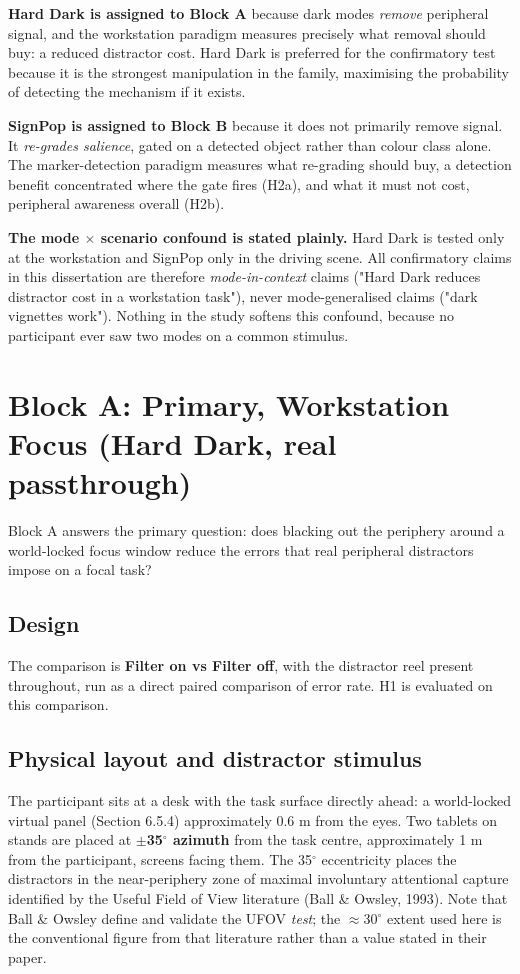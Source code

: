 \textbf{Hard Dark is assigned to Block A} because dark modes \textit{remove} peripheral signal, and the
workstation paradigm measures precisely what removal should buy: a reduced distractor cost. Hard Dark
is preferred for the confirmatory test because it is the strongest manipulation in the family,
maximising the probability of detecting the mechanism if it exists.

\textbf{SignPop is assigned to Block B} because it does not primarily remove signal. It \textit{re-grades
salience}, gated on a detected object rather than colour class alone. The marker-detection paradigm
measures what re-grading should buy, a detection benefit concentrated where the gate fires (H2a), and
what it must not cost, peripheral awareness overall (H2b).

\textbf{The mode $\times$ scenario confound is stated plainly.} Hard Dark is tested only at the workstation and
SignPop only in the driving scene. All confirmatory claims in this dissertation are therefore
\textit{mode-in-context} claims ("Hard Dark reduces distractor cost in a workstation task"), never
mode-generalised claims ("dark vignettes work"). Nothing in the study softens this confound, because
no participant ever saw two modes on a common stimulus.

\section{Block A: Primary, Workstation Focus (Hard Dark, real passthrough)}

Block A answers the primary question: does blacking out the periphery around a world-locked focus
window reduce the errors that real peripheral distractors impose on a focal task?

\subsection{Design}

The comparison is \textbf{Filter on vs Filter off}, with the distractor reel present throughout, run as a
direct paired comparison of error rate. H1 is evaluated on this comparison.

\subsection{Physical layout and distractor stimulus}

The participant sits at a desk with the task surface directly ahead: a world-locked virtual panel
(Section 6.5.4) approximately 0.6 m from the eyes. Two tablets on stands are placed at \textbf{$\pm$35$^{\circ}$
azimuth} from the task centre, approximately 1 m from the participant, screens facing them. The 35$^{\circ}$
eccentricity places the distractors in the near-periphery zone of maximal involuntary attentional
capture identified by the Useful Field of View literature (Ball \& Owsley, 1993). Note that Ball \&
Owsley define and validate the UFOV \textit{test}; the $\approx$30$^{\circ}$ extent used here is the conventional figure
from that literature rather than a value stated in their paper.

